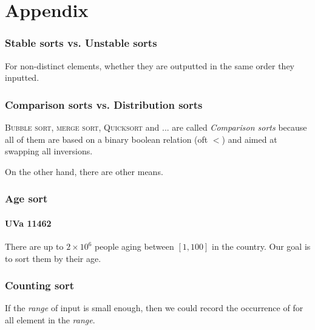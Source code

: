 \documentclass{beamer}
\begin{document}
\section{Appendix}

\frame
{
	\frametitle{Stable sorts vs. Unstable sorts}
	
	\begin{definition}[Stability]
		For non-distinct elements, whether they are outputted in the same order they inputted.
	\end{definition}
}

\frame
{
	\frametitle{Comparison sorts vs. Distribution sorts}
	
	\textsc{Bubble sort}, \textsc{merge sort}, \textsc{Quicksort} and ... are called \textit{Comparison sorts} because all of them are based on a binary boolean relation (oft $ < $) and aimed at swapping all inversions.
	
	On the other hand, there are other means.
}

\frame
{
	\frametitle{Age sort}
	\framesubtitle{UVa 11462}
	
	There are up to $2 \times 10^6$ people aging between $[1, 100]$ in the country. Our goal is to sort them by their age.
}

\frame
{
	\frametitle{Counting sort}
	
	If the \textit{range} of input is small enough, then we could record the occurrence of for all element in the \textit{range}.
}
\end{document}
